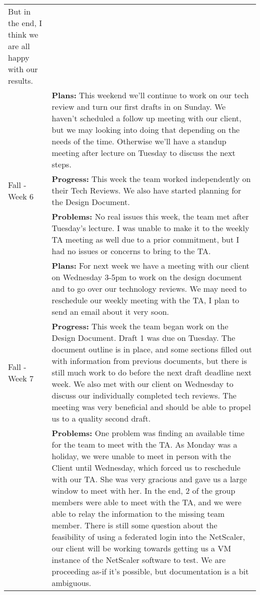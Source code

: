 \begin{longtable}[ht]{| p{1.5cm} | p{13.5cm} |}
     But in the end, I think we are all happy with our results.
     \\ & \textbf{Plans:} This weekend we'll continue to work on our tech review and turn our first drafts in on Sunday.
     We haven't scheduled a follow up meeting with our client, but we may looking into doing that depending on the needs of the time.
     Otherwise we'll have a standup meeting after lecture on Tuesday to discuss the next steps.\\
     \hline
     Fall - Week 6 &
     \textbf{Progress:} This week the team worked independently on their Tech Reviews.
     We also have started planning for the Design Document.
     \\ & \textbf{Problems:} No real issues this week, the team met after Tuesday's lecture.
     I was unable to make it to the weekly TA meeting as well due to a prior commitment, but I had no issues or concerns to bring to the TA.
     \\ & \textbf{Plans:} For next week we have a meeting with our client on Wednesday 3-5pm to work on the design document and to go over our technology reviews.
     We may need to reschedule our weekly meeting with the TA, I plan to send an email about it very soon.
     \\
     \hline
     Fall - Week 7 &
     \textbf{Progress:} This week the team began work on the Design Document.
     Draft 1 was due on Tuesday.
     The document outline is in place, and some sections filled out with information from previous documents, but there is still much work to do before the next draft deadline next week.
     We also met with our client on Wednesday to discuss our individually completed tech reviews.
     The meeting was very beneficial and should be able to propel us to a quality second draft.
     \\ & \textbf{Problems:} One problem was finding an available time for the team to meet with the TA.
     As Monday was a holiday, we were unable to meet in person with the Client until Wednesday, which forced us to reschedule with our TA.
     She was very gracious and gave us a large window to meet with her.
     In the end, 2 of the group members were able to meet with the TA, and we were able to relay the information to the missing team member.
     There is still some question about the feasibility of using a federated login into the NetScaler, our client will be working towards getting us a VM instance of the NetScaler software to test.
     We are proceeding as-if it's possible, but documentation is a bit ambiguous.

\end{longtable}
